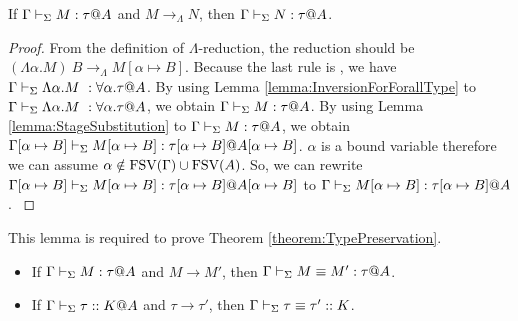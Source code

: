 \begin{lemma}
    \label{lemma:PreservationOnLambdaReduction}
    If $\G\V M:\tau@A$ and $M \longrightarrow_{\Lambda} N$, then $\G\V N:\tau@A$.
\end{lemma}

\begin{proof}
    {
        \newcommand{\R}{\longrightarrow_{\Lambda}}
        From the definition of \( \Lambda \)-reduction, the reduction should be
        $(\Lambda\alpha.M)\ B \R M[\alpha \mapsto B]$.  Because the last rule
        is \TIns{}, we have $\Gamma \vdash_\Sigma \Lambda\alpha.M\ : \forall\alpha.\tau @ A$.
        By using Lemma \ref{lemma:InversionForForallType} to $\Gamma \vdash_\Sigma
        \Lambda\alpha.M\ : \forall\alpha.\tau @ A$, we obtain $\Gamma \vdash_\Sigma M : \tau @
        A$.  By using Lemma \ref{lemma:StageSubstitution} to $\Gamma \vdash_\Sigma M : \tau @
        A$, we obtain $\Gamma[\alpha \mapsto B] \vdash_\Sigma M[\alpha \mapsto B] :
        \tau[\alpha \mapsto B] @ A[\alpha \mapsto B]$.  $\alpha$ is a bound
        variable therefore we can assume $\alpha \notin \text{FSV}(\Gamma) \cup \text{FSV}(A)$.
        So, we can rewrite $\Gamma[\alpha \mapsto B] \vdash_\Sigma M[\alpha \mapsto B] :
        \tau[\alpha \mapsto B] @ A[\alpha \mapsto B]$ to $\Gamma \vdash_\Sigma M[\alpha
        \mapsto B] : \tau[\alpha \mapsto B] @ A$.
    }
\end{proof}

\begin{lemma}
    This lemma is required to prove Theorem \ref{theorem:TypePreservation}.
    \label{lemma:EquivalencePreservation}
    \begin{itemize}
        \item If \( \Gamma \vdash_\Sigma M : \tau @ A \) and \( M \longrightarrow M' \), then \( \Gamma \vdash_\Sigma M \equiv M' : \tau @ A \).
        \item If \( \Gamma \vdash_\Sigma \tau :: K @ A \) and \( \tau \longrightarrow \tau' \), then \( \Gamma \vdash_\Sigma \tau \equiv \tau' :: K \).
    \end{itemize}
\end{lemma}

